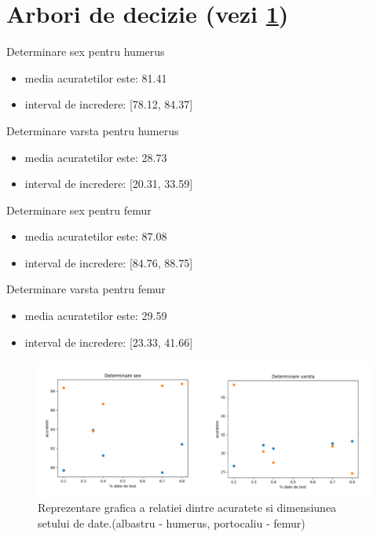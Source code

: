 \documentclass[runningheads,a4paper,11pt]{report}
\begin{document}
\section{Arbori de decizie (vezi \ref{plot_arbori})} 
\label{analizaArboriSex}
Determinare sex pentru humerus
\begin{itemize}
    \item media acuratetilor este: 81.41
    \item interval de incredere: [78.12, 84.37]
\end{itemize}

\noindent Determinare varsta pentru humerus
\begin{itemize}
    \item media acuratetilor este: 28.73
    \item interval de incredere: [20.31, 33.59]
\end{itemize}

\noindent Determinare sex pentru femur
\begin{itemize}
    \item media acuratetilor este: 87.08
    \item interval de incredere: [84.76, 88.75]
\end{itemize}

\noindent Determinare varsta pentru femur
\begin{itemize}
    \item media acuratetilor este: 29.59
    \item interval de incredere: [23.33, 41.66]
\end{itemize}

\begin{figure}[!h]
    \centering
    \includegraphics[width=18cm]{Imagini/plot_acc_arbori.PNG}
    \caption{Reprezentare grafica a relatiei dintre acuratete si dimensiunea setului de date.\newline (albastru - humerus, portocaliu - femur)}
    \label{plot_arbori}
\end{figure}
\end{document}
